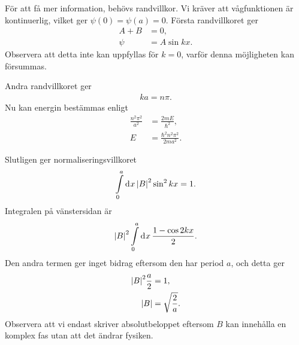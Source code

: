 För att få mer information, behövs randvillkor. Vi kräver att vågfunktionen är kontinuerlig, vilket ger $\psi(0) = \psi(a) = 0$. Första randvillkoret ger
\begin{align*}
	A + B &= 0, \\
	\psi  &= A\sin{kx}.
\end{align*}
Observera att detta inte kan uppfyllas för $k = 0$, varför denna möjligheten kan försummas.

Andra randvillkoret ger
\begin{align*}
	ka = n\pi.
\end{align*}
Nu kan energin bestämmas enligt
\begin{align*}
	\frac{n^{2}\pi^{2}}{a^{2}} &= \frac{2mE}{\hbar^{2}}, \\
	E                          &= \frac{\hbar^{2}n^{2}\pi^{2}}{2ma^{2}}.
\end{align*}

Slutligen ger normaliseringsvillkoret
\begin{align*}
	\int\limits_{0}^{a}\dd[]{x}\abs{B}^{2}\sin^{2}{kx} = 1.
\end{align*}
Integralen på vänstersidan är
\begin{align*}
	\abs{B}^{2}\int\limits_{0}^{a}\dd[]{x}\frac{1 - \cos{2kx}}{2}.
\end{align*}
Den andra termen ger inget bidrag eftersom den har period $a$, och detta ger
\begin{align*}
	\abs{B}^{2}\frac{a}{2} &= 1, \\
	\abs{B}                &= \sqrt{\frac{2}{a}}.
\end{align*}
Observera att vi endast skriver absolutbeloppet eftersom $B$ kan innehålla en komplex fas utan att det ändrar fysiken.